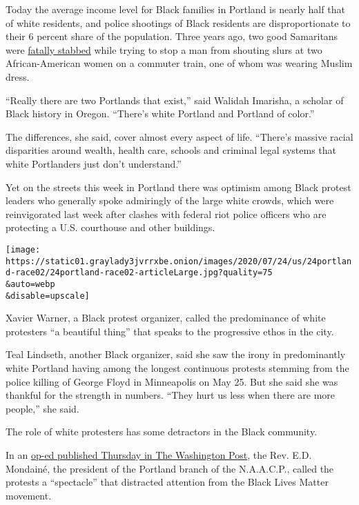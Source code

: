Today the average income level for Black families in Portland is nearly
half that of white residents, and police shootings of Black residents
are disproportionate to their 6 percent share of the population. Three
years ago, two good Samaritans were
\href{https://www.nytimes3xbfgragh.onion/2017/05/27/us/portland-train-attack-muslim-rant.html}{fatally
stabbed} while trying to stop a man from shouting slurs at two
African-American women on a commuter train, one of whom was wearing
Muslim dress.

``Really there are two Portlands that exist,'' said Walidah Imarisha, a
scholar of Black history in Oregon. ``There's white Portland and
Portland of color.''

The differences, she said, cover almost every aspect of life. ``There's
massive racial disparities around wealth, health care, schools and
criminal legal systems that white Portlanders just don't understand.''

Yet on the streets this week in Portland there was optimism among Black
protest leaders who generally spoke admiringly of the large white
crowds, which were reinvigorated last week after clashes with federal
riot police officers who are protecting a U.S. courthouse and other
buildings.

\texttt{[image: https://static01.graylady3jvrrxbe.onion/images/2020/07/24/us/24portland-race02/24portland-race02-articleLarge.jpg?quality=75\\\&auto=webp\\\&disable=upscale]}

Xavier Warner, a Black protest organizer, called the predominance of
white protesters ``a beautiful thing'' that speaks to the progressive
ethos in the city.

Teal Lindseth, another Black organizer, said she saw the irony in
predominantly white Portland having among the longest continuous
protests stemming from the police killing of George Floyd in Minneapolis
on May 25. But she said she was thankful for the strength in numbers.
``They hurt us less when there are more people,'' she said.

The role of white protesters has some detractors in the Black community.

In an
\href{https://www.washingtonpost.com/opinions/2020/07/23/portlands-protests-were-supposed-be-about-black-lives-now-theyre-white-spectacle/}{op-ed
published Thursday in The Washington Post}, the Rev. E.D. Mondainé, the
president of the Portland branch of the N.A.A.C.P., called the protests
a ``spectacle'' that distracted attention from the Black Lives Matter
movement.

